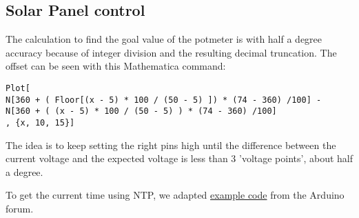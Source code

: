 \documentclass{article}
\begin{document}
		\subsection{Solar Panel control}
			The calculation to find the goal value of the potmeter is with half a degree accuracy because of integer division and the resulting decimal truncation. The offset can be seen with this Mathematica command:
			\begin{lstlisting}
Plot[
N[360 + ( Floor[(x - 5) * 100 / (50 - 5) ]) * (74 - 360) /100] - 
N[360 + ( (x - 5) * 100 / (50 - 5) ) * (74 - 360) /100]
, {x, 10, 15}]
			\end{lstlisting}
			The idea is to keep setting the right pins high until the difference between the current voltage and the expected voltage is less than 3 'voltage points', about half a degree.
			
			To get the current time using NTP, we adapted \href{http://forum.arduino.cc/index.php?topic=171941.0}{example code} from the Arduino forum.
	
\end{document}
